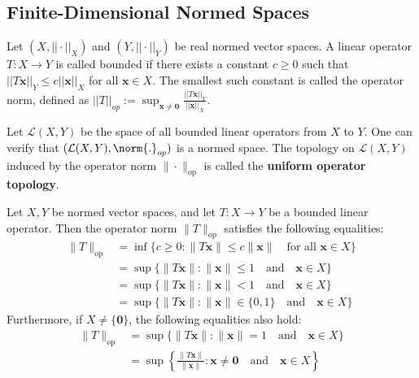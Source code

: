 \subsection{Finite-Dimensional Normed Spaces}

\begin{definition}
Let $(X, ||\cdot||_X)$ and $(Y, ||\cdot||_Y)$ be real normed vector spaces. A linear operator $T: X \rightarrow Y$ is called bounded if there exists a constant $c \ge 0$ such that $||T\mathbf{x}||_Y \le c||\mathbf{x}||_X$ for all $\mathbf{x} \in X$.
The smallest such constant is called the operator norm, defined as $||T||_{op} := \displaystyle\sup_{\mathbf{x} \ne \mathbf{0}} \frac{||T\mathbf{x}||_Y}{||\mathbf{x}||_X}$.
\end{definition}

Let $\mathcal{L}(X,Y)$ be the space of all bounded linear operators from $X$ to $Y$. One can verify that $(\mathcal{L}(X,Y), \norm{.}_{op})$ is a normed space.
The topology on $\mathcal{L}(X,Y)$ induced by the operator norm $\| \cdot \|_{\mathrm{op}}$ is called the \textbf{uniform operator topology}.


\begin{theorem}
Let $X, Y$ be normed vector spaces, and let $T: X \to Y$ be a bounded linear operator. Then the operator norm $\|T\|_{\mathrm{op}}$ satisfies the following equalities:
\begin{align}
\label{norm:inf_bound} \|T\|_{\mathrm{op}} &= \inf \{c \ge 0 : \|T\mathbf{x}\| \le c\|\mathbf{x}\| \quad \text{for all } \mathbf{x} \in X\} \\
\label{norm:sup_closed_ball} &= \sup \{\|T\mathbf{x}\| : \|\mathbf{x}\| \le 1 \quad \text{and} \quad \mathbf{x} \in X\} \\
\label{norm:sup_open_ball} &= \sup \{\|T\mathbf{x}\| : \|\mathbf{x}\| < 1 \quad \text{and} \quad \mathbf{x} \in X\} \\
\label{norm:sup_zero_one} &= \sup \{\|T\mathbf{x}\| : \|\mathbf{x}\| \in \{0, 1\} \quad \text{and} \quad \mathbf{x} \in X\}
\end{align}
Furthermore, if $X \neq \{\mathbf{0}\}$, the following equalities also hold:
\begin{align}
\label{norm:sup_sphere} \|T\|_{\mathrm{op}} &= \sup \{\|T\mathbf{x}\| : \|\mathbf{x}\| = 1 \quad \text{and} \quad \mathbf{x} \in X\} \\
\label{norm:sup_ratio} &= \sup \left\{ \frac{\|T\mathbf{x}\|}{\|\mathbf{x}\|} : \mathbf{x} \neq \mathbf{0} \quad \text{and} \quad \mathbf{x} \in X \right\}
\end{align}
\end{theorem}

